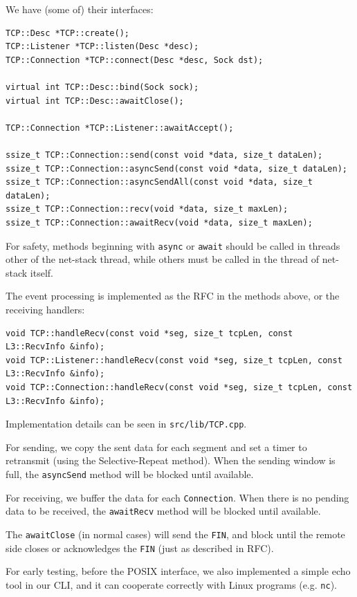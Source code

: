 \documentclass[a4paper]{article}
\begin{document}
  We have (some of) their interfaces:
  \begin{verbatim}
TCP::Desc *TCP::create();
TCP::Listener *TCP::listen(Desc *desc);
TCP::Connection *TCP::connect(Desc *desc, Sock dst);

virtual int TCP::Desc::bind(Sock sock);
virtual int TCP::Desc::awaitClose();

TCP::Connection *TCP::Listener::awaitAccept();

ssize_t TCP::Connection::send(const void *data, size_t dataLen);
ssize_t TCP::Connection::asyncSend(const void *data, size_t dataLen);
ssize_t TCP::Connection::asyncSendAll(const void *data, size_t dataLen);
ssize_t TCP::Connection::recv(void *data, size_t maxLen);
ssize_t TCP::Connection::awaitRecv(void *data, size_t maxLen);
  \end{verbatim}
  For safety, methods beginning with \texttt{async} or \texttt{await} should be called in threads other of the net-stack thread, while others must be called in the thread of net-stack itself.

  The event processing is implemented as the RFC in the methods above, or the receiving handlers:
  \begin{verbatim}
void TCP::handleRecv(const void *seg, size_t tcpLen, const L3::RecvInfo &info);
void TCP::Listener::handleRecv(const void *seg, size_t tcpLen, const L3::RecvInfo &info);
void TCP::Connection::handleRecv(const void *seg, size_t tcpLen, const L3::RecvInfo &info);
  \end{verbatim}

  Implementation details can be seen in \texttt{src/lib/TCP.cpp}.

  For sending, we copy the sent data for each segment and set a timer to retransmit (using the Selective-Repeat method).
  When the sending window is full, the \texttt{asyncSend} method will be blocked until available.

  For receiving, we buffer the data for each \texttt{Connection}.
  When there is no pending data to be received, the \texttt{awaitRecv} method will be blocked until available.

  The \texttt{awaitClose} (in normal cases) will send the \texttt{FIN}, and block until the remote side closes or acknowledges the \texttt{FIN} (just as described in RFC).

  For early testing, before the POSIX interface, we also implemented a simple echo tool in our CLI, and it can cooperate correctly with Linux programs (e.g. \texttt{nc}).
\end{document}
